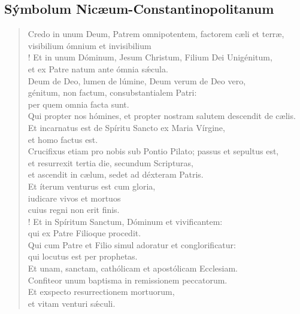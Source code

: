 \subsection*{S\'ymbolum Nicæum-Constantinopolitanum}

\begin{verse}
        Credo in unum Deum, Patrem omnipotentem,
            factorem cæli et terræ,
\\\vin      visibilium ómnium et invisibilium
%
\\!     Et in unum D\'ominum, Jesum Christum,
            Filium Dei Unig\'enitum,
\\\vin      et ex Patre natum ante \'omnia s\'{æ}cula.
\\\vin      Deum de Deo, lumen de l\'umine,
            Deum verum de Deo vero,
\\\vin      g\'enitum, non factum, consubstantialem Patri:
\\\vin      per quem omnia facta sunt.
\\      Qui propter nos h\'omines,
        et propter nostram salutem descendit de cælis.
\\\vin      Et incarnatus est de Sp\'iritu Sancto
            ex Maria V\'irgine,
\\\vin      et homo factus est.
\\      Crucifixus etiam pro nobis sub Pontio Pilato;
            passus et sepultus est,
\\      et resurrexit tertia die, secundum Scripturas,
\\      et ascendit in cælum, sedet ad d\'exteram Patris.
\\      Et \'iterum venturus est cum gloria,
\\\vin      iudicare vivos et mortuos
\\\vin      cuius regni non erit finis.
%
\\!     Et in Sp\'iritum Sanctum, D\'ominum et vivificantem:
\\\vin      qui ex Patre Filioque procedit.
\\\vin      Qui cum Patre et Filio
            simul adoratur et conglorificatur:
\\\vin      qui locutus est per prophetas.
\\      Et unam, sanctam, cath\'olicam et apost\'olicam Ecclesiam.
\\      Confiteor unum baptisma in remissionem peccatorum.
\\      Et exspecto resurrectionem mortuorum,
\\      et vitam venturi s\'{æ}culi.
\end{verse}